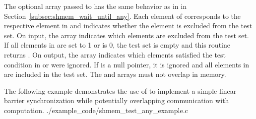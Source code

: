 \begin{apidefinition}
{    The optional  array passed to  has the
    same behavior as in  in
    Section~\ref{subsec:shmem_wait_until_any}.   Each element of 
    corresponds to the respective element in  and indicates whether
    the element is excluded from the test set.  On input, the 
    array indicates which elements are excluded from the test set.  If all
    elements in  are set to 1 or  is 0, the test set is
    empty and this routine returns .  On output, the 
    array indicates which elements satisfied the test condition in 
    or were ignored.  If  is a null pointer, it is ignored and all
    elements in  are included in the test set.  The  and
     arrays must not overlap in memory.
}



\begin{apiexamples}
  \apicexample
      {The following \Cstd[11] example demonstrates the use of
       to implement a simple linear barrier
      synchronization while potentially overlapping communication with
      computation.}
      {./example_code/shmem_test_any_example.c}
      {}
\end{apiexamples}

\end{apidefinition}

